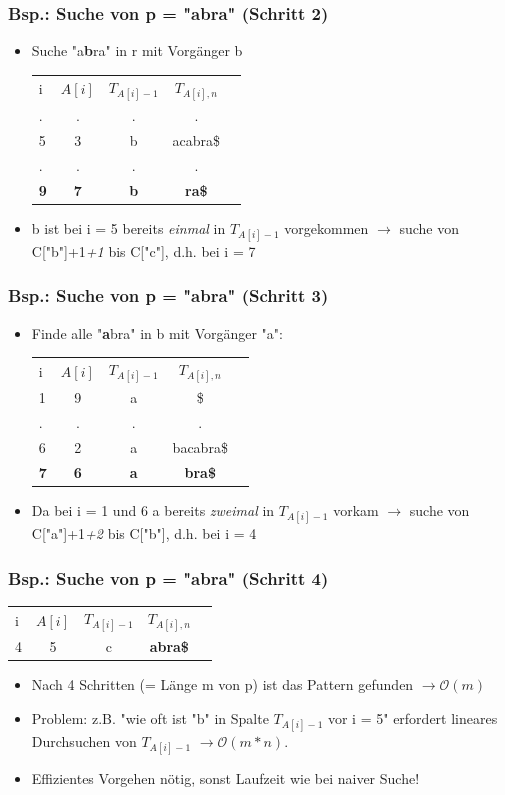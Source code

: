 \documentclass{beamer}
\begin{document}
\begin{frame}
\frametitle{Bsp.: Suche von p = "abra" (Schritt 2)}
\begin{itemize}
\item Suche "a\color{red}\textbf{b}\color{black}ra" in r mit Vorg\"anger b
\begin{tabular}{l c cc r}
i & $A[i]$ & $T_{A[i]-1}$ & $T_{A[i],n}$\\
. & . & . & .\\
5 & 3 & b & acabra\$ \\
. & . & . & .\\
\textbf{9} & \textbf{7} & \color{red}\textbf{b} & \textbf{ra\$} \\
\end{tabular}
\item b ist bei i = 5 bereits \textit{einmal} in $T_{A[i]-1}$ vorgekommen $\rightarrow$ suche von C["b"]+1\textit{+1} bis C["c"], d.h. bei i = 7
\end{itemize}
\end{frame}
\begin{frame}
\frametitle{Bsp.: Suche von p = "abra" (Schritt 3)}
\begin{itemize}
\item Finde alle "\color{red}\textbf{a}\color{black}bra" in b mit Vorg\"anger "a":
\begin{tabular}{l c cc r}
i & $A[i]$ & $T_{A[i]-1}$ & $T_{A[i],n}$\\
1 & 9 & a & \$ \\
. & . & . & .\\
6 & 2 & a & bacabra\$ \\
\textbf{7} & \textbf{6}  & \color{red}\textbf{a} & \textbf{bra\$} \\
\end{tabular}
\item Da bei i = 1 und 6 a bereits \textit{zweimal} in $T_{A[i]-1}$ vorkam $\rightarrow$ suche von C["a"]+1\textit{+2} bis C["b"], d.h. bei i = 4
\end{itemize}
\end{frame}
\begin{frame}
\frametitle{Bsp.: Suche von p = "abra" (Schritt 4)}
\begin{tabular}{l c cc r}
i & $A[i]$ & $T_{A[i]-1}$ & $T_{A[i],n}$\\
4 & 5 & c & \color{red}\textbf{abra\$} \\
\end{tabular}
\begin{itemize}
\item Nach 4 Schritten (= L\"ange m von p) ist das Pattern gefunden $\rightarrow { \scriptstyle \mathcal{O	}}(m)$
\item Problem: z.B. "wie oft ist "b" in Spalte $T_{A[i]-1}$ vor i = 5" erfordert lineares Durchsuchen von $T_{A[i]-1}$ $\rightarrow { \scriptstyle \mathcal{O	}}(m*n)$.
\item Effizientes Vorgehen n\"otig, sonst Laufzeit wie bei naiver Suche!
\end{itemize}
\end{frame}
\end{document}
